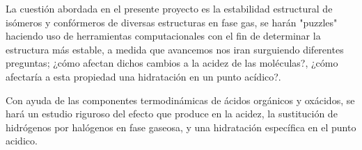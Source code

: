La cuestión abordada en el presente proyecto es la estabilidad estructural de isómeros y confórmeros de diversas estructuras en fase gas, se harán "puzzles" haciendo uso de herramientas computacionales  con el fin de determinar la estructura más estable, a medida que avancemos nos iran surguiendo diferentes preguntas; ¿cómo afectan dichos cambios a la acidez de las moléculas?, ¿cómo afectaría a esta propiedad una hidratación en un punto acídico?.

Con ayuda de las componentes termodinámicas de ácidos orgánicos y oxácidos, se hará un estudio riguroso del efecto que produce en la acidez, la sustitución de hidrógenos por halógenos en fase gaseosa, y una hidratación específica en el punto acidico. \cite{quimica3} 
